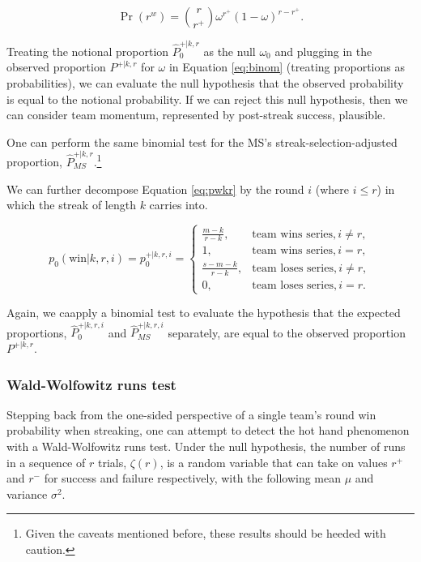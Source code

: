 \documentclass{article}
\begin{document}
\begin{equation}\label{eq:binom}
\Pr(r^w) = {\binom {r}{r^+}} \omega^{r^+}(1-\omega)^{r-r^+}.
\end{equation}

Treating the notional proportion \(\hat{P}^{+|k,r}_0\) as the null
\(\omega_0\) and plugging in the observed proportion \(P^{+|k,r}\) for
\(\omega\) in Equation \ref{eq:binom} (treating proportions as
probabilities), we can evaluate the null hypothesis that the observed
probability is equal to the notional probability. If we can reject this
null hypothesis, then we can consider team momentum, represented by
post-streak success, plausible.

One can perform the same binomial test for the MS's
streak-selection-adjusted proportion,
\(\hat{P}^{+|k,r}_{MS}\).\footnote{Given the caveats mentioned before,
  these results should be heeded with caution.}

We can further decompose Equation \ref{eq:pwkr} by the round \(i\)
(where \(i \leq r\)) in which the streak of length \(k\) carries into.

\begin{equation}\label{eq:pwkri}
p_0(\text{win} | k, r, i) = p^{+|k,r,i}_0 = \begin{cases}
\frac{m - k}{r - k}, & \text{team wins series}, i \neq r, \\
1, & \text{team wins series}, i = r, \\
\frac{s - m - k}{r - k}, & \text{team loses series}, i \neq r, \\
0, & \text{team loses series}, i = r.
\end{cases}
\end{equation}

Again, we caapply a binomial test to evaluate the hypothesis that the
expected proportions, \(\hat{P}^{+|k,r,i}_0\) and
\(\hat{P}^{+|k,r,i}_{MS}\) separately, are equal to the observed
proportion \(P^{+|k,r}\).

\hypertarget{wald-wolfowitz-runs-test}{%
\subsubsection{Wald-Wolfowitz runs
test}\label{wald-wolfowitz-runs-test}}

Stepping back from the one-sided perspective of a single team's round
win probability when streaking, one can attempt to detect the hot hand
phenomenon with a Wald-Wolfowitz runs test. Under the null hypothesis,
the number of runs in a sequence of \(r\) trials, \(\zeta(r)\), is a
random variable that can take on values \(r^+\) and \(r^-\) for success
and failure respectively, with the following mean \(\mu\) and variance
\(\sigma^2\).
\end{document}
